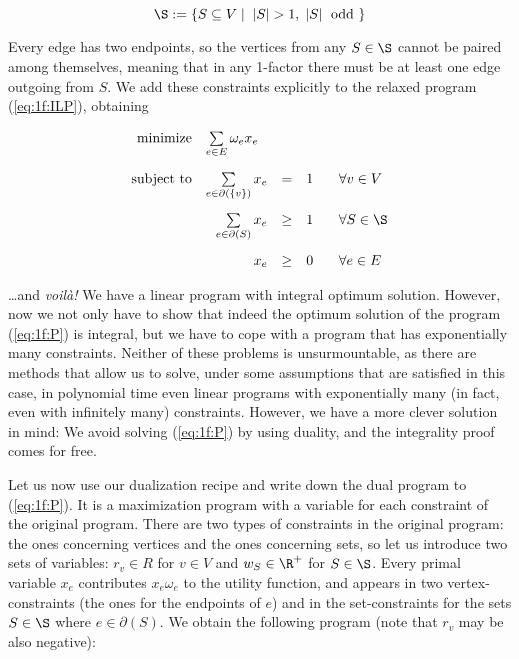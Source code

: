 $$\S:=\left\{ S\subseteq V\mid\; |S|>1,\;|S|\;{\rm\ odd\ }\right\}$$

\noindent
Every edge has two endpoints, so the vertices from any  $S\in\S$ cannot be paired among themselves, meaning
that in any 1-factor there must be at least one edge outgoing from $S$. We add these constraints explicitly 
to the relaxed program
(\ref{eq:1f:ILP}),
obtaining

\begin{equation}
  \label{eq:1f:P}
\begin{array}{rrcll}
  {\rm minimize}     & \multicolumn{1}{l}{\sum\limits_{e\in E}\omega_ex_e}\\[4ex]
  {\rm subject\ to} &  \sum\limits_{e\in\partial(\{v\})} x_e &=&1& \;\;\;\forall v\in V\\[4ex]
                          & \sum\limits_{e\in\partial(S)}x_e&\ge&1&\;\;\;\forall S\in\S\\[4ex]
                          & x_e&\ge&0& \;\;\;\forall e\in E\\
\end{array}
\end{equation}

\noindent
\ldots and {\em voilà!} We have a linear program with integral optimum solution. However, now we not only have to 
show that indeed the optimum solution of the program (\ref{eq:1f:P}) is integral, but we have to cope with a 
program that has exponentially many constraints. Neither of these problems is unsurmountable, as there are
methods that allow us to solve, under some assumptions that are satisfied in this case, in polynomial time
even linear programs with exponentially many (in fact, even with infinitely many) constraints. However, we 
have a more clever solution in mind: We avoid solving (\ref{eq:1f:P}) by using duality, and the integrality
proof comes for free. 

\noindent
Let us now use our dualization recipe and write down the dual program to  (\ref{eq:1f:P}).
It is a maximization program with a variable for each constraint of the original program. There are two
types of constraints in the original program: the ones concerning vertices and the ones concerning sets,
so let us introduce two sets of variables: $r_v\in R$ for $v\in V$
and $w_S\in\R^+$ for $S\in\S$.
Every primal variable $x_e$ contributes $x_e\omega_e$ to the utility function, and appears in two 
vertex-constraints (the ones for the endpoints of $e$) and in the set-constraints for the sets 
$S\in\S$ where $e\in\partial(S)$. We obtain the following program (note that $r_v$ may be also negative):

